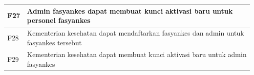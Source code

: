 \begin{longtable}{|p{0.8cm}|p{11.5cm}|}
	F27         & Admin fasyankes dapat membuat kunci aktivasi baru untuk personel fasyankes                                                                     \\ \hline
	F28         & Kementerian kesehatan dapat mendaftarkan fasyankes dan admin untuk fasyankes tersebut                                                          \\ \hline
	F29         & Kementerian kesehatan dapat membuat kunci aktivasi baru untuk admin fasyankes                                                                  \\ \hline
\end{longtable}